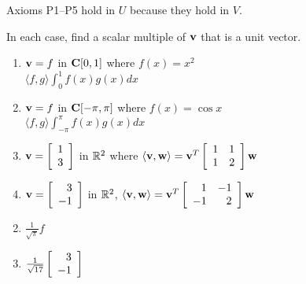\begin{multicols}{2}
\begin{ex}
\begin{sol}
Axioms P1--P5 hold in $U$ because they hold in $V$.
\end{sol}
\end{ex}

\begin{ex}
In each case, find a scalar multiple of $\textbf{v}$ that is a unit vector.

\begin{enumerate}[label={\alph*.}]
\item $\textbf{v} = f$ in $\textbf{C}[0, 1]$ where 
$f(x) = x^2$  \\ $\langle f, g \rangle \int_{0}^{1} f(x)g(x)dx$

\item $\textbf{v} = f$ in $\textbf{C}[-\pi, \pi]$ where 
$f(x) = \cos x$ \\ $\langle f, g \rangle \int_{-\pi}^{\pi} f(x)g(x)dx$

\item $\textbf{v} = 
\left[ \begin{array}{r}
1 \\
3
\end{array} \right]$
in $\mathbb{R}^2$ where $\langle \textbf{v}, \textbf{w} \rangle = \textbf{v}^T
\left[ \begin{array}{rr}
1 & 1 \\
1 & 2
\end{array} \right]
\textbf{w}$

\item $ \textbf{v} = 
\left[ \begin{array}{r}
3 \\
-1
\end{array} \right]$
in $\mathbb{R}^2$, $\langle \textbf{v}, \textbf{w} \rangle = \textbf{v}^T
\left[ \begin{array}{rr}
1 & -1 \\
-1 & 2
\end{array} \right]
\textbf{w}$

\end{enumerate}
\begin{sol}
\begin{enumerate}[label={\alph*.}]
\setcounter{enumi}{1}
\item  $\frac{1}{\sqrt{\pi}}f$

\setcounter{enumi}{3}
\item  
$\tfrac{1}{\sqrt{17}}
\left[ \begin{array}{r}
3 \\
-1
\end{array} \right]$


\end{enumerate}
\end{sol}
\end{ex}
\end{multicols}
